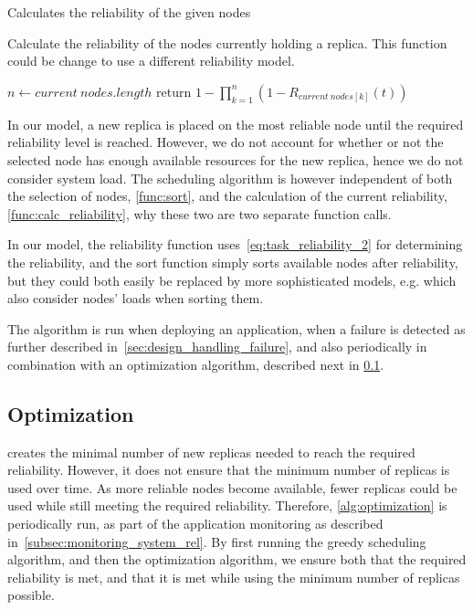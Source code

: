 \documentclass{cslthse-msc}
\begin{document}
\begin{function} 
	\caption{Calculates the reliability of the given nodes} \label{func:calc_reliability}
	Calculate the reliability of the nodes currently holding a replica. This function could be change to use a different reliability model.
	\begin{algorithmic}[1]
	\Statex
		\State $n\gets current\ nodes.length$
		\State return $ 1 - \prod\limits_{k=1}^n (1 - R_{current\ nodes[k]}(t))$
	\EndFunction
	\end{algorithmic}
\end{function}

In our model, a new replica is placed on the most reliable node until the required reliability level is reached. However, we do not account for whether or not the selected node has enough available resources for the new replica, hence we do not consider system load. The scheduling algorithm is however independent of both the selection of nodes, \cref{func:sort}, and the calculation of the current reliability, \cref{func:calc_reliability}, why these two are two separate function calls. 

In our model, the reliability function uses~\cref{eq:task_reliability_2} for determining the reliability, and the sort function simply sorts available nodes after reliability, but they could both easily be replaced by more sophisticated models, e.g. which also consider nodes' loads when sorting them.

The algorithm is run when deploying an application, when a failure is detected as further described in~\cref{sec:design_handling_failure}, and also periodically in combination with an optimization algorithm, described next in \cref{subsec:design_optimization}.

\subsection{Optimization} \label{subsec:design_optimization}
 creates the minimal number of new replicas needed to reach the required reliability. However, it does not ensure that the minimum number of replicas is used over time. As more reliable nodes become available, fewer replicas could be used while still meeting the required reliability. Therefore, \cref{alg:optimization} is periodically run, as part of the application monitoring as described in~\cref{subsec:monitoring_system_rel}. By first running the greedy scheduling algorithm, and then the optimization algorithm, we ensure both that the required reliability is met, and that it is met while using the minimum number of replicas possible.
 
\end{document}
